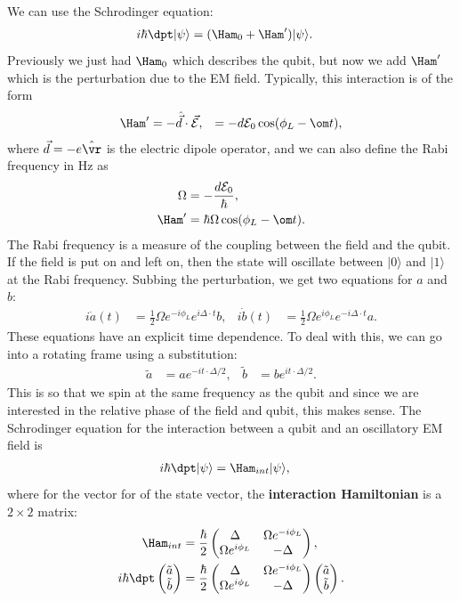 \documentclass[a4paper, 11pt, normalem]{report}
\begin{document}
We can use the Schrodinger equation:
\begin{align}
    i\hbar\dpt|\psi\rangle &= (\Ham_0+\Ham')|\psi\rangle.
\end{align}
Previously we just had $\Ham_0$ which describes the qubit, but now we add $\Ham'$ which is the perturbation due to the EM field.
Typically, this interaction is of the form
\begin{align}
    \Ham' &= -\hat{\vec{d}}\cdot\vec{\mathcal{E}},
          &= -d\mathcal{E}_0\cos(\phi_L-\om t),
\end{align}
where $\vec{d}=-e\hat{\vr}$ is the electric dipole operator, and we can also define the Rabi frequency in Hz as
\begin{align}
    \Omega &= -\frac{d\mathcal{E}_0}{\hbar}, \\
    \Ham' &= \hbar\Omega\cos(\phi_L-\om t).
\end{align}
The Rabi frequency is a measure of the coupling between the field and the qubit.
If the field is put on and left on, then the state will oscillate between $|0\rangle$ and $|1\rangle$ at the Rabi frequency.
Subbing the perturbation, we get two equations for $a$ and $b$:
\begin{align}
    i\dot{a}(t) &= \frac12\Omega e^{-i\phi_L}e^{i\Delta\cdot t}b, & i\dot{b}(t) &= \frac12\Omega e^{i\phi_L}e^{-i\Delta\cdot t}a.
\end{align}
These equations have an explicit time dependence.
To deal with this, we can go into a rotating frame using a substitution:
\begin{align}
    \tilde{a} &= ae^{-it\cdot\Delta/2}, & \tilde{b} &= be^{it\cdot\Delta/2}.
\end{align}
This is so that we spin at the same frequency as the qubit and since we are interested in the relative phase of the field and qubit, this makes sense.
The Schrodinger equation for the interaction between a qubit and an oscillatory EM field is
\begin{align}
    i\hbar\dpt|\psi\rangle &= \Ham_{int}|\psi\rangle,
\end{align}
where for the vector for of the state vector, the \textbf{interaction Hamiltonian} is a $2\times2$ matrix:
\begin{align}
    \Ham_{int} &= \frac{\hbar}{2}\begin{pmatrix} \Delta & \Omega e^{-i\phi_L} \\ \Omega e^{i\phi_L} & -\Delta\end{pmatrix}, \\
    i\hbar\dpt \begin{pmatrix}\tilde{a}\\ \tilde{b}\end{pmatrix} &= \frac{\hbar}{2}\begin{pmatrix}\Delta & \Omega e^{-i\phi_L} \\ \Omega e^{i\phi_L} & -\Delta\end{pmatrix}\begin{pmatrix}\tilde{a}\\ \tilde{b}\end{pmatrix}.
\end{align}
\end{document}

